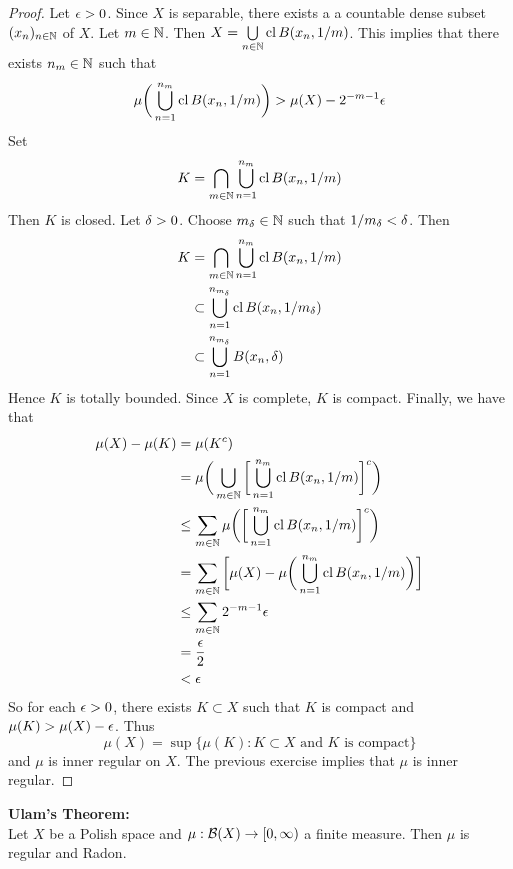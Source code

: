 \documentclass{book}
\begin{document}
	\begin{proof}
		Let $\epsilon >0$. Since $X$ is separable, there exists a a countable dense subset $(x_{n})_{n \in \mathbb{N}}$ of $X$. Let $m \in \mathbb{N}$. Then $X = \bigcup\limits_{n \in \mathbb{N}} \operatorname{cl} B(x_n, 1/m)$. This implies that there exists $n_m \in \mathbb{N}$ such that 
		$$\mu \bigg(\bigcup\limits_{n = 1}^{n_m} \operatorname{cl} B(x_n, 1/m) \bigg) > \mu(X) - 2^{-m-1}\epsilon$$ 
		Set 
		$$K = \bigcap\limits_{m \in \mathbb{N}} \bigcup\limits_{n = 1}^{n_m} \operatorname{cl} B(x_n, 1/m) $$
		Then $K$ is closed. Let $\delta >0$. Choose $m_{\delta} \in \mathbb{N}$ such that $1/m_{\delta} < \delta$. Then 
		\begin{align*}
			K 
			&=  \bigcap\limits_{m \in \mathbb{N}} \bigcup\limits_{n = 1}^{n_m} \operatorname{cl} B(x_n, 1/m) \\
			& \subset \bigcup\limits_{n = 1}^{n_{m_{\delta}}} \operatorname{cl} B(x_n, 1/{m_{\delta}}) \\
			& \subset  \bigcup\limits_{n = 1}^{n_{m_{\delta}}} B(x_n, \delta) \\ 
		\end{align*}
		Hence $K$ is totally bounded. Since $X$ is complete, $K$ is compact. Finally, we have that 
		\begin{align*}
			\mu(X) - \mu(K)
			&= \mu(K^c) \\
			&= \mu \bigg( \bigcup\limits_{m \in \mathbb{N}} \bigg[ \bigcup\limits_{n = 1}^{n_m} \operatorname{cl} B(x_n, 1/m) \bigg]^c  \bigg) \\
			&\leq \sum_{m \in \mathbb{N}} \mu \bigg( \bigg[ \bigcup\limits_{n = 1}^{n_m} \operatorname{cl} B(x_n, 1/m) \bigg]^c \bigg) \\
			&= \sum_{m \in \mathbb{N}} \bigg[ \mu(X) - \mu \bigg(  \bigcup\limits_{n = 1}^{n_m} \operatorname{cl} B(x_n, 1/m)  \bigg) \bigg] \\
			& \leq \sum_{m \in \mathbb{N}} 2^{-m-1}\epsilon \\
			&= \frac{\epsilon}{2} \\
			&< \epsilon
		\end{align*} 
	So for each $\epsilon >0$, there exists $K \subset X$ such that $K$ is compact and $\mu(K) > \mu(X) - \epsilon$. Thus $$\mu(X) = \sup\{\mu(K): \text{$K \subset X$ and $K$ is compact}\}$$ and $\mu$ is inner regular on $X$. The previous exercise implies that $\mu$ is inner regular.   
	\end{proof}
	
	\begin{ex} \textbf{Ulam's Theorem:} \\
		Let $X$ be a Polish space and $\mu: \mathcal{B}(X) \rightarrow [0, \infty)$ a finite measure. Then $\mu$ is regular and Radon.
	\end{ex}
\end{document}
